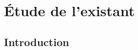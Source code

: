 \chapter{Étude de l'existant}
\thispagestyle{empty}

\newpage
\section*{Introduction}

\paragraph{}
